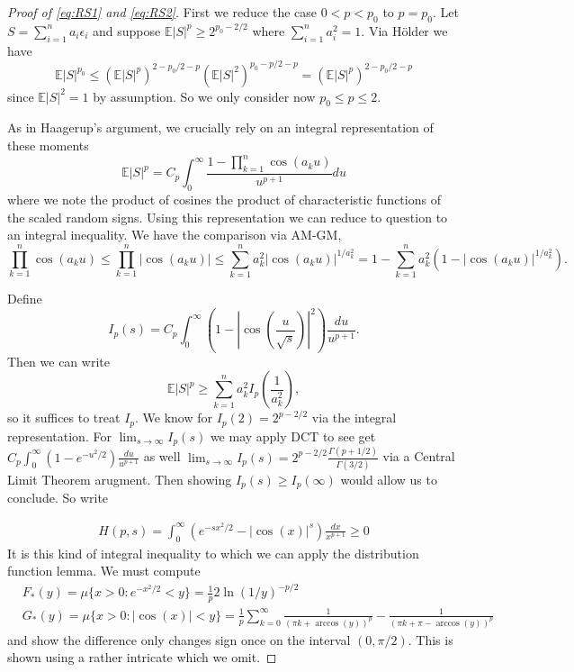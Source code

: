 \documentclass[10pt]{article}
\newcommand{\E}{\mathbb{E}}
\newcommand{\1}{\textbf{1}}
\theoremstyle{remark}
\theoremstyle{definition}
\begin{document}
\begin{proof}[Proof of \ref{eq:RS1} and \ref{eq:RS2}]
	First we reduce the case $0 < p < p_0$ to $p = p_0$. Let $S = \sum_{i=1}^n a_i \epsilon_i$ and suppose $\E|S|^p \geq 2^{p_0 - 2/2}$ where $\sum_{i=1}^n a_i^2 = 1$. Via H\"older we have
	\begin{equation*}
		\E|S|^{p_0} \leq (\E|S|^p)^{2-p_0/2-p}(\E|S|^2)^{p_0-p/2-p} = (\E|S|^p)^{2-p_0/2-p}
	\end{equation*} 
	since $\E|S|^2 = 1$ by assumption. So we only consider now $p_0 \leq p \leq 2$. 

	As in Haagerup's argument, we crucially rely on an integral representation of these moments
	\begin{equation*}
		\E|S|^p = C_p\int_0^{\infty}\frac{1-\prod_{k=1}^n \cos(a_k u)}{u^{p+1}}du
	\end{equation*} where we note the product of cosines the product of characteristic functions of the scaled random signs. Using this representation we can reduce to question to an integral inequality. We have the comparison via AM-GM,
	\begin{equation*}
		\prod_{k=1}^n \cos(a_k u) \leq \prod_{k=1}^n |\cos(a_k u)| \leq \sum_{k=1}^n a_k^2|\cos(a_k u)|^{1/a_k^2} = 1 - \sum_{k=1}^na_k^2(1- |\cos(a_k u)|^{1/a_k^2}).
	\end{equation*}

	Define 
	\begin{equation*}
		I_p(s) = C_p\int_0^{\infty}(1-|\cos(\frac{u}{\sqrt{s}})|^2)\frac{du}{u^{p+1}}.
	\end{equation*} Then we can write
	\begin{equation*}
		\E|S|^p \geq \sum_{k=1}^na_k^2 I_p(\frac{1}{a_k^2}),
	\end{equation*} so it suffices to treat $I_p$. We know for $I_p(2) = 2^{p-2/2}$ via the integral representation. For $\lim_{s \to \infty}I_p(s)$ we may apply DCT to see get $C_p \int_0^{\infty}(1-e^{-u^2/2})\frac{du}{u^{p+1}}$ as well $\lim_{s \to \infty}I_p(s) = 2^{p-2/2}\frac{\Gamma(p+1/2)}{\Gamma(3/2)}$ via a Central Limit Theorem arugment. Then showing $I_p(s) \geq I_p(\infty)$ would allow us to conclude. So write

	\begin{align*}
		H(p,s) = \int_0^{\infty}(e^{-sx^2/2} - |\cos(x)|^s)\frac{dx}{x^{p+1}} \geq 0 
	\end{align*} It is this kind of integral inequality to which we can apply the distribution function lemma. We must compute
	\begin{align*}
		&F_*(y) = \mu\{x > 0 : e^{-x^2/2} < y\} = \frac{1}{p}2\ln(1/y)^{-p/2}\\
		&G_*(y) = \mu\{x > 0: |\cos(x)| < y\} = \frac{1}{p}\sum_{k=0}^{\infty}\frac{1}{(\pi k + \arccos(y))^p} - \frac{1}{(\pi k + \pi - \arccos(y))^p}
	\end{align*} and show the difference only changes sign once on the interval $(0,\pi/2)$. This is shown using a rather intricate which we omit.


\end{proof}
\end{document}
